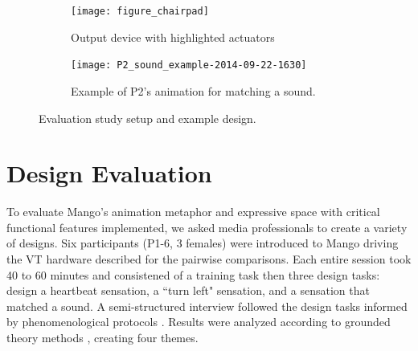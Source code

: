\begin{figure}[t] %
   \centering
     \begin{subfigure}[b]{0.43\textwidth}
	   	\texttt{[image: figure\_chairpad]} 
	   \caption{Output device with highlighted actuators}
	   \label{fig:rendering:device}
    \end{subfigure}
    \qquad
       \begin{subfigure}[b]{0.5\textwidth}
       		\centering
	   	\texttt{[image: P2\_sound\_example-2014-09-22-1630]} 
	\caption{Example of P2's animation for matching a sound.}
	\label{fig:animation:example:p2}
    \end{subfigure}
    	   \caption{Evaluation study setup and example design.}
	   \label{fig:rendering}
\end{figure}



%
%
\section{Design Evaluation}
To evaluate Mango's %
animation metaphor and expressive space with critical functional features implemented, we asked media professionals to
create a variety of designs.
%
Six participants (P1-6, 3 females) were introduced to Mango driving %
the  VT hardware described for the pairwise comparisons. 
Each entire session took 40 to 60 minutes and consistened of a training task then three design tasks: design a heartbeat sensation, a ``turn left" sensation, and a sensation that matched a sound.
A semi-structured interview followed the design tasks informed by phenomenological protocols \cite{Moustakas1994}.
%
%
Results were analyzed
according to %
grounded theory methods \cite{Corbin2008}, creating four themes.

